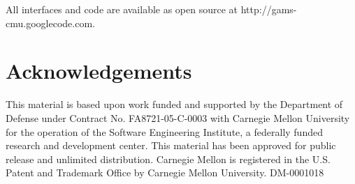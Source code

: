 \documentclass{sig-alternate-ipsn13}
\begin{document}
All interfaces and code are available as open source at
http://gams-cmu.googlecode.com.

\section{Acknowledgements}
\label{sec:acknowledgements}

This material is based upon work funded and supported by the Department of
Defense under Contract No. FA8721-05-C-0003 with Carnegie Mellon University
for the operation of the Software Engineering Institute, a federally funded research
and development center. This material has been approved for public release and
unlimited distribution. Carnegie Mellon is registered in the U.S. Patent and
Trademark Office by Carnegie Mellon University. DM-0001018

 

\end{document}
